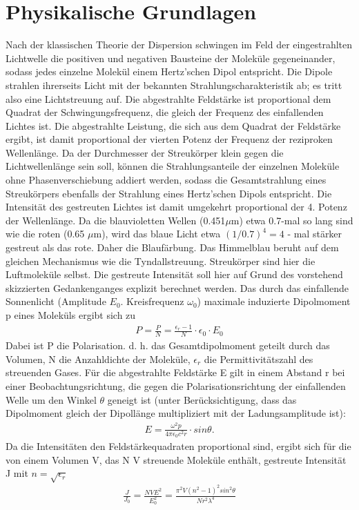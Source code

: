 \section{Physikalische Grundlagen}

Nach der klassischen Theorie der Dispersion schwingen im Feld der eingestrahlten Lichtwelle die positiven und negativen Bausteine der Moleküle gegeneinander, sodass jedes einzelne Molekül einem Hertz'schen Dipol entspricht. Die Dipole strahlen ihrerseits Licht mit der bekannten Strahlungscharakteristik ab; es tritt also eine Lichtstreuung auf. Die abgestrahlte Feldstärke ist proportional dem Quadrat der Schwingungsfrequenz, die gleich der Frequenz des einfallenden Lichtes ist. Die abgestrahlte Leistung, die sich aus dem Quadrat der Feldstärke ergibt, ist damit proportional der vierten Potenz der Frequenz der reziproken Wellenlänge.
Da der Durchmesser der Streukörper klein gegen die Lichtwellenlänge sein soll, können die Strahlungsanteile der einzelnen Moleküle ohne Phasenverschiebung addiert werden, sodass die Gesamtstrahlung eines Streukörpers ebenfalls der Strahlung eines Hertz'schen Dipols entspricht. Die Intensität des gestreuten Lichtes ist damit umgekehrt proportional der 4. Potenz der Wellenlänge. Da die blauvioletten Wellen (0.451$\mu$m) etwa 0.7-mal so lang sind wie die roten (0.65 $\mu$m), wird das blaue Licht etwa $(1/0.7)^4 =4$ - mal stärker gestreut als das rote. Daher die Blaufärbung.
Das Himmelblau beruht auf dem gleichen Mechanismus wie die Tyndallstreuung.
Streukörper sind hier die Luftmoleküle selbst. Die gestreute Intensität soll hier auf Grund des vorstehend skizzierten Gedankenganges explizit berechnet werden.
Das durch das einfallende Sonnenlicht (Amplitude $E_0$. Kreisfrequenz $\omega_0$) maximale induzierte Dipolmoment p eines Moleküls ergibt sich zu
\begin{align}
P= \frac{P}{N} = \frac{\epsilon_r - 1}{N} \cdot \epsilon_0 \cdot 	E_0
\end{align}
Dabei ist P die Polarisation. d. h. das Gesamtdipolmoment geteilt durch das Volumen, N die Anzahldichte der Moleküle, $\epsilon_r$ die Permittivitätszahl des streuenden Gases. Für die abgestrahlte Feldstärke E gilt in einem Abstand r bei einer Beobachtungsrichtung, die gegen die Polarisationsrichtung der einfallenden Welle um den Winkel $\theta$ geneigt ist (unter Berücksichtigung, dass das Dipolmoment gleich der Dipollänge multipliziert mit der Ladungsamplitude ist):
\begin{align}
E= \frac{\omega^2 p}{4 \pi \epsilon_0 c^2 r} \cdot sin \theta.
\end{align}
Da die Intensitäten den Feldstärkequadraten proportional sind, ergibt sich für die von einem Volumen V, das N V streuende Moleküle enthält, gestreute Intensität J mit $n=\sqrt{\epsilon_r}$
\begin{align}
\frac{J}{J_0}= \frac{NVE^2}{E_0^2} =  \frac{\pi^2V(n^2-1)^2 sin^2\theta}{Nr^2\lambda^4}
\end{align}

